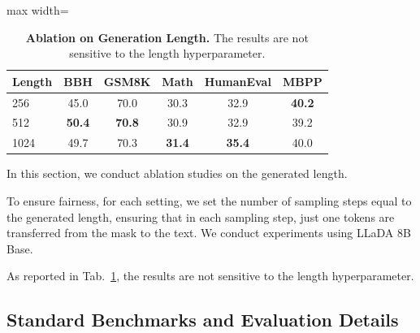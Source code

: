 \documentclass{article}
\begin{document}
\begin{table}[t!]
    \centering
    \caption{\textbf{Ablation on Generation Length.} The results are not sensitive to the length hyperparameter.}
    \label{tab:ablation-length}
    \vspace{.2cm}
    \begin{adjustbox}{max width=\textwidth}
    \begin{tabular}{lccccc}
      \toprule
         Length & BBH & GSM8K & Math & HumanEval & MBPP \\
         \midrule
        256 & 45.0	& 70.0 & 30.3& 32.9& \textbf{40.2}\\
        512 & \textbf{50.4}	& \textbf{70.8}	& 30.9	& 32.9 & 39.2\\
        1024 & 49.7	& 70.3	& \textbf{31.4}& \textbf{35.4}&	40.0\\
      \bottomrule
    \end{tabular}
    \end{adjustbox}
    \vspace{-.2cm}
\end{table}

In this section, we conduct ablation studies on the generated length. 

To ensure fairness, for each setting, we set the number of sampling steps equal to the generated length, ensuring that in each sampling step, just one tokens are transferred from the mask to the text. We conduct experiments using LLaDA 8B Base.


As reported in Tab.~\ref{tab:ablation-length}, the results are not sensitive to the length hyperparameter.




\subsection{Standard Benchmarks and Evaluation Details}
\label{app:bench}
\end{document}
